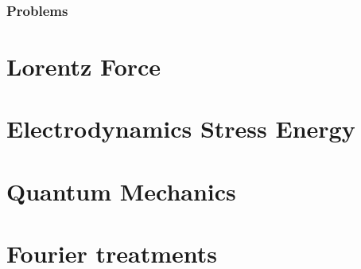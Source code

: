       \section{Problems}
         

\part{Lorentz Force}
   
   
   
   
   

\part{Electrodynamics Stress Energy}
   
   
   
   
   
   
   
   
   
   
   

\part{Quantum Mechanics}
   
   
   
   
   
   
   
   

\part{Fourier treatments}
   
   
   
   
   
   
   
   
   
%
%
%
